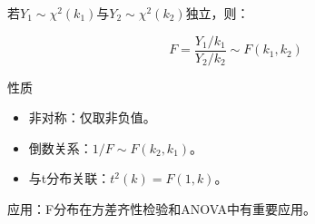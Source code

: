 \begin{flushleft}
若$Y_1 \sim \chi^2(k_1)$与$Y_2 \sim \chi^2(k_2)$独立，则：
\end{flushleft}
\begin{equation}
F = \frac{Y_1/k_1}{Y_2/k_2} \sim F(k_1,k_2)
\end{equation}

\begin{flushleft}
性质
\end{flushleft}
\begin{itemize}
	\item 非对称：仅取非负值。
	\item 倒数关系：$1/F \sim F(k_2,k_1)$。
	\item 与t分布关联：$t^2(k) = F(1,k)$。
\end{itemize}

\begin{flushleft}
应用：F分布在方差齐性检验和ANOVA中有重要应用。
\end{flushleft}

